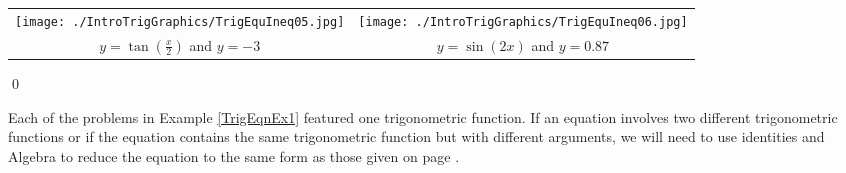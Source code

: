 \begin{ex}
\begin{enumerate}
\enlargethispage*{.5in}

\begin{center}

\begin{tabular}{cc}

\texttt{[image: ./IntroTrigGraphics/TrigEquIneq05.jpg]} &

\hspace{0.75in} \texttt{[image: ./IntroTrigGraphics/TrigEquIneq06.jpg]} \\

$y = \tan\left(\frac{x}{2}\right)$ and \boldmath $y = -3$    & 

 \hspace{0.75in}  $y = \sin(2x)$ and \boldmath $y = 0.87$ \\

\end{tabular}

\end{center} 

\end{enumerate}

\vspace*{-.3in} \qed

\end{ex}

\pagebreak

Each of the problems in Example \ref{TrigEqnEx1} featured one trigonometric function.  If an equation involves two different trigonometric functions or if the equation contains the same trigonometric function but with different arguments, we will need to use identities and Algebra to reduce the equation to the same form as those given on page  \pageref{trigeqnstrategy1}.
 
